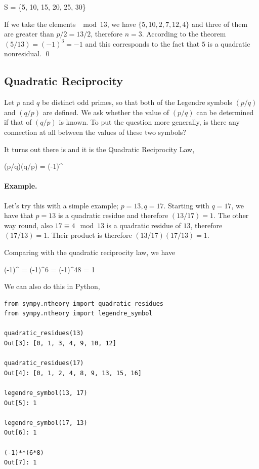 \bee
S = \{5, 10, 15, 20, 25, 30\}
\eee

If we take the elements $\mod 13$, we have $\{5, 10, 2, 7, 12, 4\}$ and three of them are greater than $p/2 = 13/2$, therefore $n=3$. According to the theorem $(5/13) = (-1)^3 = -1$ and this corresponds to the fact that $5$ is a quadratic nonresidual. \qed

\subsection{Quadratic Reciprocity}

Let $p$ and $q$ be distinct odd primes, so that both of the Legendre symbols $(p/q)$ and $(q/p)$ are defined. We ask whether the value of $(p/q)$ can be determined if that of $(q/p)$ is known. To put the question more generally, is there any connection at all between the values of these two symbols?

It turns out there is and it is the Quadratic Reciprocity Law,

\bee
(p/q)(q/p) = (-1)^{  }
\eee

\paragraph{Example.} Let's try this with a simple example; $p=13, q=17$. Starting with $q=17$, we have that $p=13$ is a quadratic residue and therefore $(13/17) = 1$. The other way round, also $17 \equiv 4 \mod 13$ is a quadratic residue of $13$, therefore $(17/13) = 1$. Their product is therefore $(13/17) (17/13) = 1$.

Comparing with the quadratic reciprocity law, we have

\bee
(-1)^{ } = (-1)^{6 } = (-1)^{48} = 1
\eee

We can also do this in Python,

\begin{verbatim}
from sympy.ntheory import quadratic_residues
from sympy.ntheory import legendre_symbol

quadratic_residues(13)
Out[3]: [0, 1, 3, 4, 9, 10, 12]

quadratic_residues(17)
Out[4]: [0, 1, 2, 4, 8, 9, 13, 15, 16]

legendre_symbol(13, 17)
Out[5]: 1

legendre_symbol(17, 13)
Out[6]: 1

(-1)**(6*8)
Out[7]: 1
\end{verbatim}



